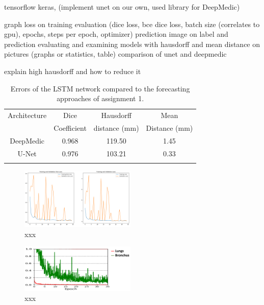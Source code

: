 
tensorflow keras, (implement unet on our own, used library for DeepMedic)

graph loss on training evaluation (dice loss, bce dice loss, batch size (correlates to gpu), epochs, steps per epoch, optimizer)
prediction
image on label and prediction 
evaluating and examining models with hausdorff and mean distance on pictures (graphs or statistics, table)
comparison of unet and deepmedic

explain high hausdorff and how to reduce it

\begin{table}[h!]
	\centering
	\setlength{\tabcolsep}{10pt}
	\renewcommand{\arraystretch}{1.5}
	\begin{tabular}{c c c c}
		\hline 
		Architecture & Dice & Hausdorff & Mean \\
		& Coefficient & distance (mm) & Distance (mm) \\ 
		\hline 
		DeepMedic & 0.968 & 119.50 & 1.45 \\ 
		U-Net & 0.976 & 103.21 & 0.33 \\ 
		\hline
		\newline 
	\end{tabular}
	\caption{Errors of the LSTM network compared to the forecasting approaches of assignment 1.}
	\label{table_result}
\end{table}


\begin{figure}[h!]
	\includegraphics[width=0.49\textwidth, angle=0]{files/jpgunettrain.png}
	\caption{xxx}
	\label{scan_picture}
\end{figure}

\begin{figure}[h!]
	\includegraphics[width=0.49\textwidth, angle=0]{files/deepmedictrain.png}
	\caption{xxx}
	\label{scan_picture}
\end{figure}

